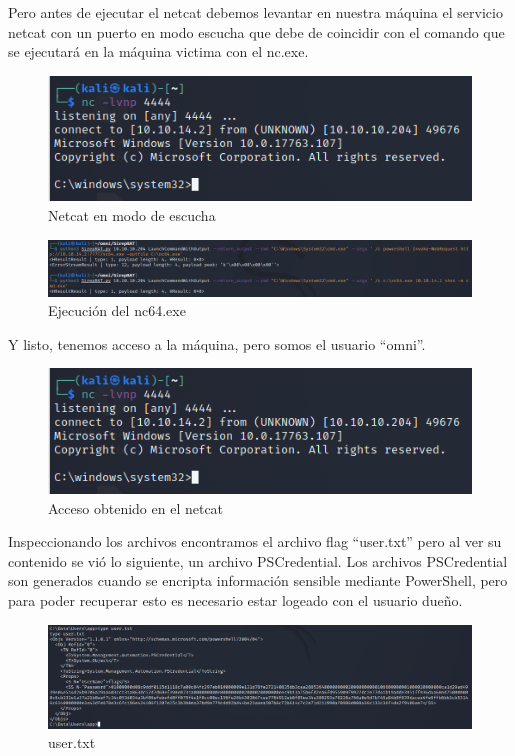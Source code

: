 \documentclass{article}
\begin{document}
Pero antes de ejecutar el netcat debemos levantar en nuestra máquina el servicio netcat con un puerto en modo escucha que debe de coincidir con el comando que se ejecutará en la máquina victima con el nc.exe.
\begin{figure}[H]
	\center
	\includegraphics[width=\textwidth]{images/omni/6.png}
	\caption{Netcat en modo de escucha}
\end{figure}
\begin{figure}[H]
	\center
	\includegraphics[width=\textwidth]{images/omni/7.png}
	\caption{Ejecución del nc64.exe}
\end{figure}

Y listo, tenemos acceso a la máquina, pero somos el usuario “omni”.
\begin{figure}[H]
	\center
	\includegraphics[width=\textwidth]{images/omni/8.png}
	\caption{Acceso obtenido en el netcat}
\end{figure}

Inspeccionando los archivos encontramos el archivo flag “user.txt” pero al ver su contenido se vió lo siguiente, un archivo PSCredential. Los archivos PSCredential son generados cuando se encripta información sensible mediante PowerShell, pero para poder recuperar esto es necesario estar logeado con el usuario dueño.
\begin{figure}[H]
	\center
	\includegraphics[width=\textwidth]{images/omni/9.png}
	\caption{user.txt}
\end{figure}
\end{document}
